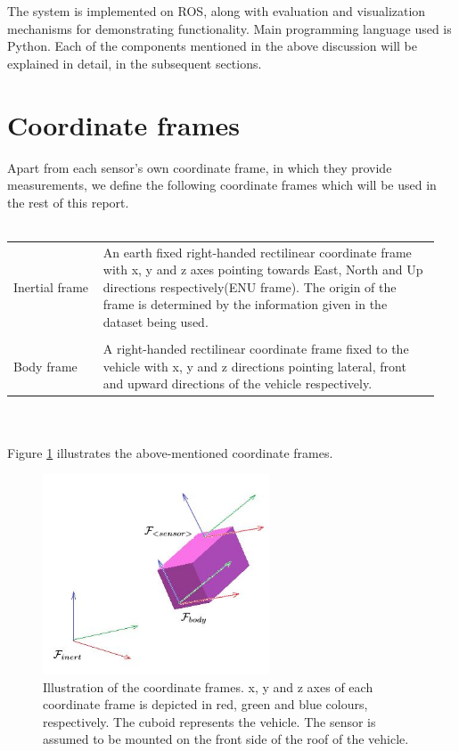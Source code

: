 The system is implemented on \gls{ROS}, along with evaluation and visualization mechanisms for demonstrating functionality. Main programming language used is Python. Each of the components mentioned in the above discussion will be explained in detail, in the subsequent sections.







\section{Coordinate frames}
Apart from each sensor's own coordinate frame, in which they provide measurements, we define the following coordinate frames which will be used in the rest of this report.\\\\
\begin{tabular}{p{0.2\linewidth} p{0.75\linewidth} } 
	Inertial frame & An earth fixed right-handed rectilinear coordinate frame with x, y and z axes pointing towards East, North and Up directions respectively(ENU frame). The origin of the frame is determined by the information given in the dataset being used.\\\\
	Body frame & A right-handed rectilinear coordinate frame fixed to the vehicle with x, y and z directions pointing lateral, front and upward directions of the vehicle respectively.
\end{tabular}\\\\
Figure \ref{fig:pa:coordinateFrames} illustrates the above-mentioned coordinate frames.
\begin{figure}[h]
	\begin{center}
	\includegraphics[width=0.6\textwidth]{figs/coordinate-frames.jpg}
	\end{center}
	\vspace{-0.5cm}
	\caption[Coordinate frames]{Illustration of the coordinate frames. x, y and z axes of each coordinate frame is depicted in red, green and blue colours, respectively. The cuboid represents the vehicle. The sensor is assumed to be mounted on the front side of the roof of the vehicle.}
	\label{fig:pa:coordinateFrames}
	\vspace{0.5cm}
\end{figure}







